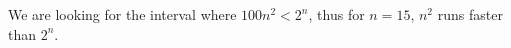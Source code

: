 
We are looking for the interval where $100n^2 < 2^n$, thus for $n = 15$, $n^2$
runs faster than $2^n$.
